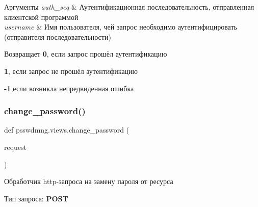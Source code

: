 \begin{DoxyParams}{Аргументы}
{\em auth\+\_\+seq} & Аутентификационная последовательность, отправленная клиентской программой \\
\hline
{\em username} & Имя пользователя, чей запрос необходимо аутентифицировать (отправителя последовательности) \\
\hline
\end{DoxyParams}
\begin{DoxyReturn}{Возвращает}
{\bfseries 0}, если запрос прошёл аутентификацию 

{\bfseries 1}, если запрос не прошёл аутентификацию 

{\bfseries -\/1},если возникла непредвиденная ошибка 
\end{DoxyReturn}
\mbox{\label{namespacepsswdmng_1_1views_a2a0f4820fa5b24534e02581bacc53617}} 
\subsubsection{change\+\_\+password()}
{\footnotesize\ttfamily def psswdmng.\+views.\+change\+\_\+password (\begin{DoxyParamCaption}\item[{}]{request }\end{DoxyParamCaption})}



Обработчик http-\/запроса на замену пароля от ресурса 

Тип запроса\+: {\bfseries P\+O\+ST} 

